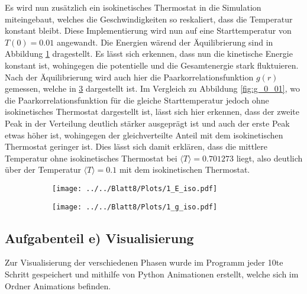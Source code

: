 Es wird nun zusätzlich ein isokinetisches Thermostat in die Simulation miteingebaut, welches die Geschwindigkeiten so reskaliert, dass die Temperatur konstant bleibt. Diese Implementierung wird nun auf eine Starttemperatur von $T(0)=0.01$ angewandt. Die Energien wärend der Äquilibrierung sind in Abbildung \ref{fig:E_iso} dragestellt. Es lässt sich erkennen, dass nun die kinetische Energie konstant ist, wohingegen die potentielle und die Gesamtenergie stark fluktuieren. Nach der Äquilibrierung wird auch hier die Paarkorrelationsfunktion $g(r)$ gemessen, welche in
\ref{fig:g_0_01_iso} dargestellt ist. Im Vergleich zu Abbildung \ref{fig:g_0_01}, wo die Paarkorrelationsfunktion für die gleiche Starttemperatur jedoch ohne isokinetisches Thermostat dargestellt ist, lässt sich hier erkennen, dass der zweite Peak in der Verteilung deutlich stärker ausgeprägt ist und auch der erste Peak etwas höher ist, wohingegen der gleichverteilte Anteil mit dem isokinetischen Thermostat geringer ist. Dies lässt sich damit erklären, dass die mittlere Temperatur ohne isokinetisches Thermostat bei $\langle T \rangle =0.701273$ liegt, also deutlich über der Temperatur $\langle T \rangle =0.1$ mit dem isokinetischen Thermostat.

\begin{figure}[H]
\begin{subfigure}[c]{0.5\textwidth}
\texttt{[image: ../../Blatt8/Plots/1\_E\_iso.pdf]}
\label{fig:E_iso}
\end{subfigure}
\begin{subfigure}[c]{0.5\textwidth}
\texttt{[image: ../../Blatt8/Plots/1\_g\_iso.pdf]}
\label{fig:g_0_01_iso}
\end{subfigure}
\end{figure}


\subsection*{Aufgabenteil e) Visualisierung}
Zur Visualisierung der verschiedenen Phasen wurde im Programm jeder 10te Schritt gespeichert und mithilfe von Python Animationen erstellt, welche sich im Ordner Animations befinden.
